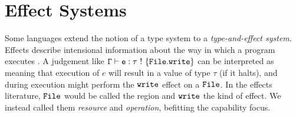 \section{Effect Systems}

Some languages extend the notion of a type system to a \textit{type-and-effect system}. Effects describe intensional information about the way in which a program executes \cite{nielson99}. A judgement like $\mathtt{\Gamma \vdash e: \tau~!~\{ File.write \}}$ can be interpreted as meaning that execution of $e$ will result in a value of type $\tau$ (if it halts), and during execution might perform the $\mathtt{write}$ effect on a $\mathtt{File}$. In the effects literature, $\mathtt{File}$ would be called the region and $\mathtt{write}$ the kind of effect. We instead called them \textit{resource} and \textit{operation}, befitting the capability focus.
